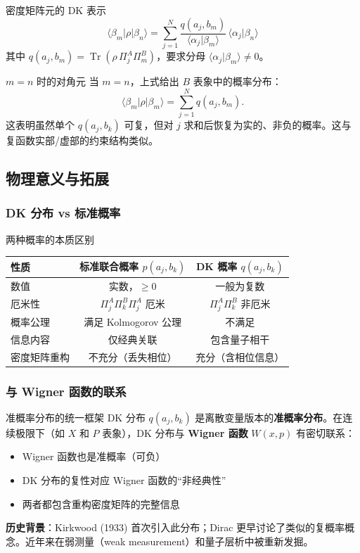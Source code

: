 \begin{formulabox}{密度矩阵元的 DK 表示}
\[
  \boxed{\langle\beta_m|\rho|\beta_n\rangle = \sum_{j=1}^N \frac{q(a_j,b_m)}{\langle\alpha_j|\beta_m\rangle}\,\langle\alpha_j|\beta_n\rangle}
\]
其中 $q(a_j,b_m)=\operatorname{Tr}(\rho\,\Pi_j^A\Pi_m^B)$，要求分母 $\langle\alpha_j|\beta_m\rangle\neq 0$。
\end{formulabox}

\begin{insightbox}{$m=n$ 时的对角元}
当 $m=n$，上式给出 $B$ 表象中的概率分布：
\[
  \langle\beta_m|\rho|\beta_m\rangle = \sum_{j=1}^N q(a_j,b_m).
\]
这表明虽然单个 $q(a_j,b_k)$ 可复，但对 $j$ 求和后恢复为实的、非负的概率。这与复函数实部/虚部的约束结构类似。
\end{insightbox}


\subsection{物理意义与拓展}

\subsubsection{DK 分布 vs 标准概率}

\begin{insightbox}{两种概率的本质区别}
\begin{center}
\begin{tabular}{lcc}
\toprule
\textbf{性质} & \textbf{标准联合概率 $p(a_j,b_k)$} & \textbf{DK 概率 $q(a_j,b_k)$} \\
\midrule
数值 & 实数，$\ge 0$ & 一般为复数 \\
厄米性 & $\Pi_j^A\Pi_k^B\Pi_j^A$ 厄米 & $\Pi_j^A\Pi_k^B$ 非厄米 \\
概率公理 & 满足 Kolmogorov 公理 & 不满足 \\
信息内容 & 仅经典关联 & 包含量子相干 \\
密度矩阵重构 & 不充分（丢失相位） & 充分（含相位信息） \\
\bottomrule
\end{tabular}
\end{center}
\end{insightbox}

\subsubsection{与 Wigner 函数的联系}

\begin{insightbox}{准概率分布的统一框架}
DK 分布 $q(a_j,b_k)$ 是离散变量版本的\textbf{准概率分布}。在连续极限下（如 $X$ 和 $P$ 表象），DK 分布与 \textbf{Wigner 函数} $W(x,p)$ 有密切联系：
\begin{itemize}[nosep]
  \item Wigner 函数也是准概率（可负）
  \item DK 分布的复性对应 Wigner 函数的``非经典性''
  \item 两者都包含重构密度矩阵的完整信息
\end{itemize}
\textbf{历史背景}：Kirkwood (1933) 首次引入此分布；Dirac 更早讨论了类似的复概率概念。近年来在弱测量（weak measurement）和量子层析中被重新发掘。
\end{insightbox}


